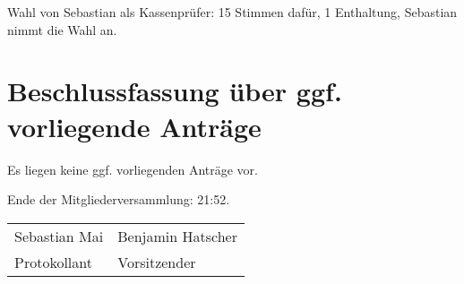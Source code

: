\documentclass[a4paper,12pt,titlepage]{scrartcl}
\begin{document}
Wahl von Sebastian als Kassenprüfer: 15 Stimmen dafür, 1 Enthaltung, Sebastian nimmt die Wahl an.


\section{Beschlussfassung über ggf. vorliegende Anträge}
Es liegen keine ggf. vorliegenden Anträge vor.


Ende der Mitgliederversammlung: 21:52.


\nopagebreak
\vspace{10\baselineskip}
\begin{tabularx}{\textwidth}[b]{X X}
	\hline
	Sebastian Mai  & Benjamin Hatscher \\
	Protokollant & Vorsitzender
\end{tabularx}

\appendix
%
\end{document}
